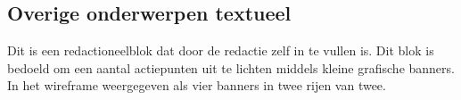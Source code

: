 \subsection{Overige onderwerpen textueel}
\label{sec:overigeonderwerpentextueel}
Dit is een redactioneelblok dat door de redactie zelf in te vullen is. Dit blok is bedoeld om een aantal actiepunten uit te lichten middels kleine grafische banners. In het wireframe weergegeven als vier banners in twee rijen van twee.